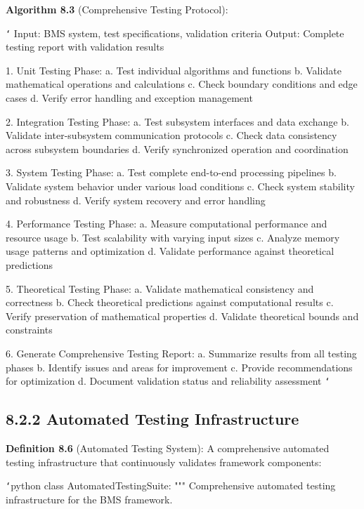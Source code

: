 \textbf{Algorithm 8.3} (Comprehensive Testing Protocol):

\texttt{`}
Input: BMS system, test specifications, validation criteria
Output: Complete testing report with validation results

1. Unit Testing Phase:
   a. Test individual algorithms and functions
   b. Validate mathematical operations and calculations
   c. Check boundary conditions and edge cases
   d. Verify error handling and exception management
   
2. Integration Testing Phase:
   a. Test subsystem interfaces and data exchange
   b. Validate inter-subsystem communication protocols
   c. Check data consistency across subsystem boundaries
   d. Verify synchronized operation and coordination
   
3. System Testing Phase:
   a. Test complete end-to-end processing pipelines
   b. Validate system behavior under various load conditions
   c. Check system stability and robustness
   d. Verify system recovery and error handling
   
4. Performance Testing Phase:
   a. Measure computational performance and resource usage
   b. Test scalability with varying input sizes
   c. Analyze memory usage patterns and optimization
   d. Validate performance against theoretical predictions
   
5. Theoretical Testing Phase:
   a. Validate mathematical consistency and correctness
   b. Check theoretical predictions against computational results
   c. Verify preservation of mathematical properties
   d. Validate theoretical bounds and constraints
   
6. Generate Comprehensive Testing Report:
   a. Summarize results from all testing phases
   b. Identify issues and areas for improvement
   c. Provide recommendations for optimization
   d. Document validation status and reliability assessment
\texttt{`}

\subsection{8.2.2 Automated Testing Infrastructure}

\textbf{Definition 8.6} (Automated Testing System): A comprehensive automated testing infrastructure that continuously validates framework components:

\texttt{`}python
class AutomatedTestingSuite:
    """
    Comprehensive automated testing infrastructure for the BMS framework.
    
